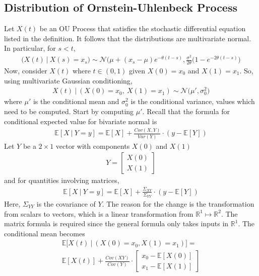 \documentclass{article}
\newcommand{\R}{\mathbb{R}}
\newcommand{\NL}{\newline
\newline}
\newcommand{\EX}{\mathbb{E}}
\begin{document}
\subsection{Distribution of Ornstein-Uhlenbeck Process}
Let $X(t)$ be an OU Process that satisfies the stochastic differential equation listed in the definition. It follows that the distributions are multivariate normal. In particular, for $s<t$,
\begin{align*}
    \Big(X(t)~\Big|~X(s)=x_s\Big)\sim \mathcal{N}\Big(\mu+(x_s-\mu)e^{-\theta(t-s)},\frac{\sigma^2}{2\theta}(1-e^{-2\theta(t-s)}\Big)
\end{align*}
Now, consider $X(t)$ where $t\in(0,1)$ given $X(0)=x_0$ and $X(1)=x_1$. So, using multivariate Gaussian conditioning,
\begin{align*}
    X(t)~\Big|~(X(0)=x_0,~X(1)=x_1)\sim \mathcal{N}\Big(\mu',\sigma_0^2\Big)
\end{align*}
where $\mu'$ is the conditional mean and $\sigma_0^2$ is the conditional variance, values which need to be computed.
\NL
Start by computing $\mu'$. Recall that the formula for conditional expected value for bivariate normal is
\begin{align*}
    \EX[X~|~Y=y]=\EX[X]+\frac{Cov(X,Y)}{Var(Y)}\cdot (y-\EX[Y])
\end{align*}
Let $Y$ be a $2\times 1$ vector with components $X(0)$ and $X(1)$
\begin{align*}
    Y=\begin{bmatrix}
        X(0)\\
        X(1)
    \end{bmatrix}
\end{align*}
and for quantities involving matrices,
\begin{align*}
    \EX[X~|~Y=y]=\EX[X]+\frac{\Sigma_{XY}}{\Sigma_{YY}}\cdot (y-\EX[Y])
\end{align*}
Here, $\Sigma_{YY}$ is the covariance of $Y$. The reason for the change is the transformation from scalars to vectors, which is a linear transformation from $\R^1\mapsto \R^2$. The matrix formula is required since the general formula only takes inputs in $\R^1$. The conditional mean becomes
\begin{align*}
    \EX\Big[X(t)~\Big|~(X(0)=x_0,X(1)=x_1)\Big]=\\
    \EX[X(t)]+\frac{Cov(XY)}{Cov(Y)}\cdot
    \begin{bmatrix}
        x_0-\EX[X(0)]\\
        x_1-\EX[X(1)]
    \end{bmatrix}
\end{align*}
\end{document}
